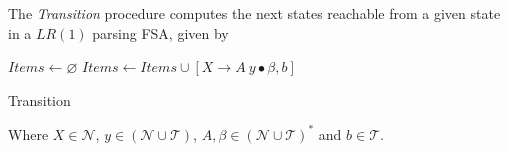 \begin{definition}
    The \textit{Transition} procedure computes the next states reachable from a given state in a $LR(1)$ parsing FSA, given by
    \begin{algorithm}[H]
        \begin{algorithmic}[1]
                \State $Items \gets \varnothing$
                    \State $Items \gets Items \cup [X \to A\ y \bullet \beta, b]$
                \EndFor
                \State {}
            \EndProcedure
        \end{algorithmic}
        \caption{Transition}
        \label{prog:transition-lr1}
    \end{algorithm}
    
    Where $X \in \mathcal{N}$, $y \in (\mathcal{N} \cup \mathcal{T})$, $A, \beta \in (\mathcal{N} \cup \mathcal{T})^\ast$ and $b \in \mathcal{T}$.
\end{definition}

